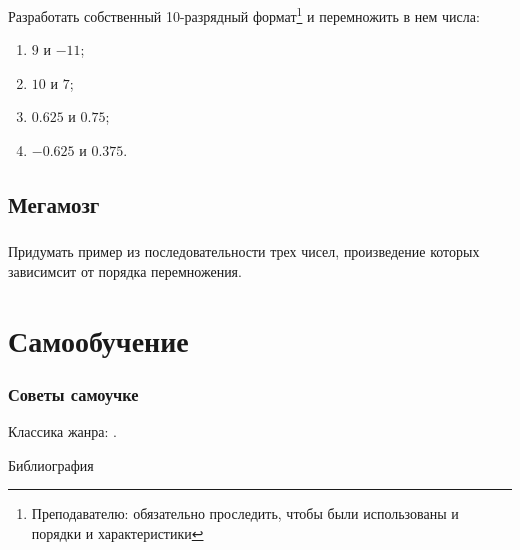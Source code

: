 \begin{frame}
    \frametitle{\TaskSimpleNumber}

    Разработать собственный 10-разрядный формат\footnote{Преподавателю: обязательно проследить, чтобы были использованы и порядки и характеристики} и перемножить в нем числа:

    \begin{enumerate}
        \item $9$ и $-11$;
        \item $10$ и $7$;
        \item $0.625$ и $0.75$;
        \item $-0.625$ и $0.375$.
    \end{enumerate}
\end{frame}

\subsection{Мегамозг}

\begin{frame}
    \frametitle{\TaskSimpleNumber}
    
    Придумать пример из последовательности трех чисел, произведение которых зависимсит от порядка перемножения. 
\end{frame}

\section{Самообучение}

\begin{frame}
    \frametitle{Советы самоучке}
    
    Классика жанра: \cite{bib:lisikov:automateBase}.
\end{frame}

\begin{frame}[allowframebreaks]{Библиография}
    
    
\end{frame}

